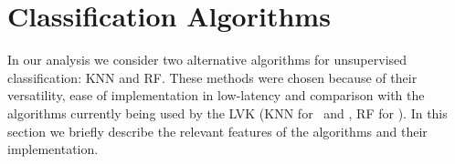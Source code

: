 \section{Classification Algorithms} \label{algos}

In our analysis we consider two alternative algorithms for unsupervised classification: \ac{KNN} and \ac{RF}. These methods were chosen because of their versatility, ease of implementation in low-latency and comparison with the algorithms currently being used by the \ac{LVK} (\ac{KNN} for \hasns\ and \hasrem, \ac{RF} for \hasgap).
In this section we briefly describe the relevant features of the algorithms and their implementation. 




